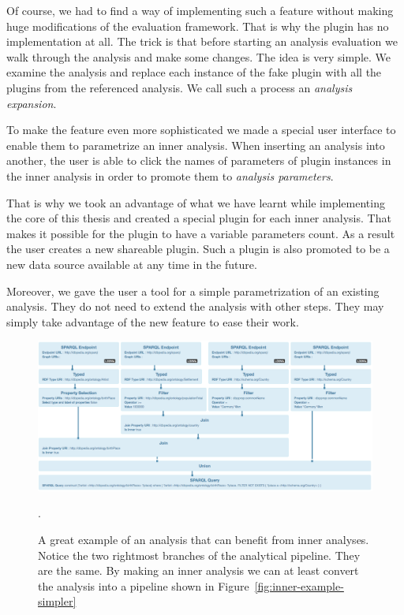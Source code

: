 Of course, we had to find a way of implementing such a feature without 
making huge modifications of the evaluation framework. That is why the plugin 
has no implementation at all. The trick is that before starting an analysis 
evaluation we walk through the analysis and make some changes. The idea is very 
simple. We examine the analysis and replace each instance of the fake plugin 
with all the plugins from the referenced analysis. We call such a process an 
\emph{analysis expansion}.

To make the feature even more sophisticated we made a special user interface to 
enable them to parametrize an inner analysis. When inserting an analysis into 
another, the user is able to click the names of parameters of plugin instances 
in the inner analysis in order to promote them to \emph{analysis parameters}.

That is why we took an advantage of what we have learnt while implementing the 
core of this thesis and created a special plugin for each inner analysis. That 
makes it possible for the plugin to have a variable parameters count. As a result the 
user creates a new shareable plugin. Such a plugin is also promoted to be a new 
data source available at any time in the future.

Moreover, we gave the user a tool for a simple parametrization of an existing analysis. 
They do not need to extend the analysis with other steps. They may simply take 
advantage of the new feature to ease their work.

\begin{figure}
	\centering
	\includegraphics[width=140mm]{img/inner-example.png}
	\caption{A great example of an analysis that can benefit from inner analyses. Notice the
	two rightmost branches of the analytical pipeline. They are the same. By making
	an inner analysis we can at least convert the analysis into a pipeline shown in 
	Figure~\ref{fig:inner-example-simpler}}.
	\label{fig:inner-example}
\end{figure}

